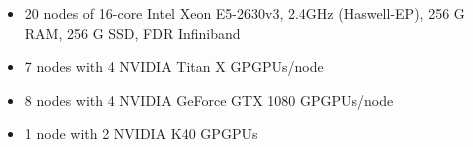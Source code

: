 \documentclass[landscape,a0paper,fontscale=0.285]{baposter} %
\newcommand{\compresslist}{ %
\setlength{\itemsep}{1pt}
\setlength{\parskip}{0pt}
\setlength{\parsep}{0pt}
}
\begin{document}
\begin{poster}
{\colorbox[HTML]{cdb87d}{}
\begin{itemize}\compresslist
\item 20 nodes of 16-core Intel Xeon E5-2630v3, 2.4GHz (Haswell-EP), 256 G RAM, 256 G SSD, FDR Infiniband
\end{itemize}

\colorbox[HTML]{cdb87d}{}
\begin{itemize}\compresslist
\item 7 nodes with 4 NVIDIA Titan X GPGPUs/node
\item 8 nodes with 4 NVIDIA GeForce GTX 1080 GPGPUs/node
\item 1 node with 2 NVIDIA K40 GPGPUs
\end{itemize}

}

\end{poster}
\newpage

\end{document}
